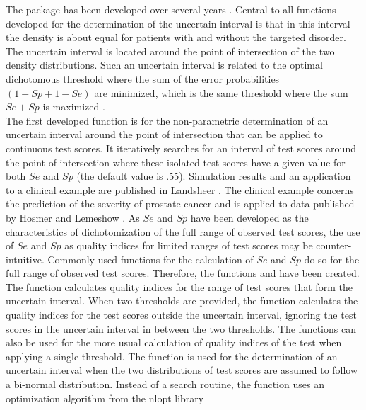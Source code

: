 \documentclass[
  nojss]{jss}
\begin{document}
The  package has been developed over several
years \citep{landsheer_interval_2016, landsheer_clinical_2018}. Central
to all functions developed for the determination of the uncertain
interval is that in this interval the density is about equal for
patients with and without the targeted disorder. The uncertain interval
is located around the point of intersection of the two density
distributions. Such an uncertain interval is related to the optimal
dichotomous threshold where the sum of the error probabilities
\((1 - Sp + 1 - Se)\) are minimized, which is the same threshold where
the sum \(Se + Sp\) is maximized \citep{youden_index_1950}.\\
The first developed function is  for the non-parametric
determination of an uncertain interval around the point of intersection
that can be applied to continuous test scores. It iteratively searches
for an interval of test scores around the point of intersection where
these isolated test scores have a given value for both \(Se\) and \(Sp\)
(the default value is .55). Simulation results and an application to a
clinical example are published in Landsheer
\citeyearpar{landsheer_interval_2016}. The clinical example concerns the
prediction of the severity of prostate cancer and is applied to data
published by Hosmer and Lemeshow \citeyearpar{hosmer_jr_applied_2000}.
As \(Se\) and \(Sp\) have been developed as the characteristics of
dichotomization of the full range of observed test scores, the use of
\(Se\) and \(Sp\) as quality indices for limited ranges of test scores
may be counter-intuitive. Commonly used functions for the calculation of
\(Se\) and \(Sp\) do so for the full range of observed test scores.
Therefore, the functions  and
 have been created. The function
 calculates quality indices for the
range of test scores that form the uncertain interval. When two
thresholds are provided, the function 
calculates the quality indices for the test scores outside the uncertain
interval, ignoring the test scores in the uncertain interval in between
the two thresholds. The functions can also be used for the more usual
calculation of quality indices of the test when applying a single
threshold. The function  is used for the determination
of an uncertain interval when the two distributions of test scores are
assumed to follow a bi-normal distribution. Instead of a search routine,
the function uses an optimization algorithm from the nlopt library
\end{document}

